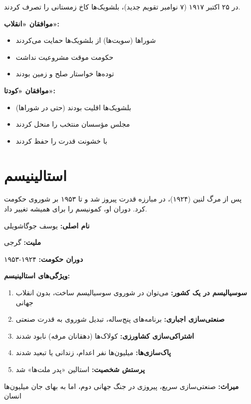 \begin{historybox}
در ۲۵ اکتبر ۱۹۱۷ (۷ نوامبر تقویم جدید)، بلشویک‌ها کاخ زمستانی را تصرف کردند.

\textbf{موافقان «انقلاب»:}
\begin{itemize}[nosep]
    \item شوراها (سویت‌ها) از بلشویک‌ها حمایت می‌کردند
    \item حکومت موقت مشروعیت نداشت
    \item توده‌ها خواستار صلح و زمین بودند
\end{itemize}

\textbf{موافقان «کودتا»:}
\begin{itemize}[nosep]
    \item بلشویک‌ها اقلیت بودند (حتی در شوراها)
    \item مجلس مؤسسان منتخب را منحل کردند
    \item با خشونت قدرت را حفظ کردند
\end{itemize}
\end{historybox}

\section{استالینیسم}

پس از مرگ لنین (۱۹۲۴)،  در مبارزه قدرت پیروز شد و تا ۱۹۵۳ بر شوروی حکومت کرد. دوران او، کمونیسم را برای همیشه تغییر داد.

\begin{personbox}

\textbf{نام اصلی:} یوسف جوگاشویلی

\textbf{ملیت:} گرجی

\textbf{دوران حکومت:} ۱۹۲۴-۱۹۵۳

\mediumspace

\textbf{ویژگی‌های استالینیسم:}
\begin{enumerate}[nosep]
    \item \textbf{سوسیالیسم در یک کشور:} می‌توان در شوروی سوسیالیسم ساخت، بدون انقلاب جهانی
    \item \textbf{صنعتی‌سازی اجباری:} برنامه‌های پنج‌ساله، تبدیل شوروی به قدرت صنعتی
    \item \textbf{اشتراکی‌سازی کشاورزی:} کولاک‌ها (دهقانان مرفه) نابود شدند
    \item \textbf{پاک‌سازی‌ها:} میلیون‌ها نفر اعدام، زندانی یا تبعید شدند
    \item \textbf{پرستش شخصیت:} استالین «پدر ملت‌ها» شد
\end{enumerate}

\mediumspace

\textbf{میراث:} صنعتی‌سازی سریع، پیروزی در جنگ جهانی دوم، اما به بهای جان میلیون‌ها انسان
\end{personbox}

